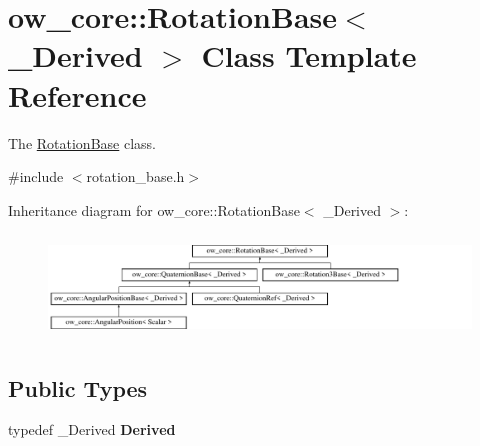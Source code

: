 \hypertarget{classow__core_1_1RotationBase}{}\section{ow\+\_\+core\+:\+:Rotation\+Base$<$ \+\_\+\+Derived $>$ Class Template Reference}
\label{classow__core_1_1RotationBase}


The \hyperlink{classow__core_1_1RotationBase}{Rotation\+Base} class.  




{\ttfamily \#include $<$rotation\+\_\+base.\+h$>$}

Inheritance diagram for ow\+\_\+core\+:\+:Rotation\+Base$<$ \+\_\+\+Derived $>$\+:\begin{figure}[H]
\begin{center}
\leavevmode
\includegraphics[height=2.786070cm]{d7/dbb/classow__core_1_1RotationBase}
\end{center}
\end{figure}
\subsection*{Public Types}
\begin{DoxyCompactItemize}
\item 
typedef \+\_\+\+Derived {\bfseries Derived}\hypertarget{classow__core_1_1RotationBase_a39f24dfe7d61a0b5f50acafbc2847579}{}\label{classow__core_1_1RotationBase_a39f24dfe7d61a0b5f50acafbc2847579}

\end{DoxyCompactItemize}
